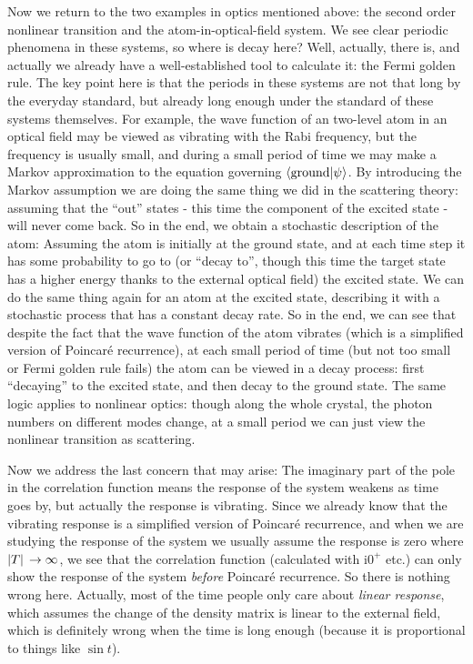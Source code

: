 \documentclass[hyperref, a4paper]{article}
\newcommand*{\ii}{\mathrm{i}}
\newenvironment{qanda}{\setlength{\parindent}{0pt}}{\bigskip}
\begin{document}
\begin{qanda}
Now we return to the two examples in optics mentioned above: the second order nonlinear transition and the atom-in-optical-field system.
We see clear periodic phenomena in these systems, so where is decay here?
Well, actually, there is, and actually we already have a well-established tool to calculate it: the Fermi golden rule. 
The key point here is that the periods in these systems are not that long by the everyday standard, 
but already long enough under the standard of these systems themselves.
For example, the wave function of an two-level atom in an optical field may be viewed as vibrating with the Rabi frequency, 
but the frequency is usually small, and during a small period of time we may make a Markov approximation to the equation governing $\braket{\text{ground}}{\psi}$.
By introducing the Markov assumption we are doing the same thing we did in the scattering theory: assuming that the ``out'' states - this time the component of the excited state - will never come back.
So in the end, we obtain a stochastic description of the atom: 
Assuming the atom is initially at the ground state, 
and at each time step it has some probability to go to (or ``decay to'', though this time the target state has a higher energy thanks to the external optical field) the excited state.
We can do the same thing again for an atom at the excited state, describing it with a stochastic process that has a constant decay rate.
So in the end, we can see that despite the fact that the wave function of the atom vibrates (which is a simplified version of Poincaré recurrence), at each small period of time (but not too small or Fermi golden rule fails) the atom can be viewed in a decay process: first ``decaying'' to the excited state, and then decay to the ground state.
The same logic applies to nonlinear optics: though along the whole crystal, the photon numbers on different modes change, 
at a small period we can just view the nonlinear transition as scattering.

Now we address the last concern that may arise: The imaginary part of the pole in the correlation function means 
the response of the system weakens as time goes by, but actually the response is vibrating.
Since we already know that the vibrating response is a simplified version of Poincaré recurrence,
and when we are studying the response of the system we usually assume the response is zero where $\abs*{T} \to \infty$, 
we see that the correlation function (calculated with $\ii 0^+$ etc.) can only show the response 
of the system \emph{before} Poincaré recurrence. So there is nothing wrong here.
Actually, most of the time people only care about \emph{linear response}, which assumes the change of the
density matrix is linear to the external field, which is definitely wrong when the time is long enough 
(because it is proportional to things like $\sin t$).


\end{qanda}
\end{document}
